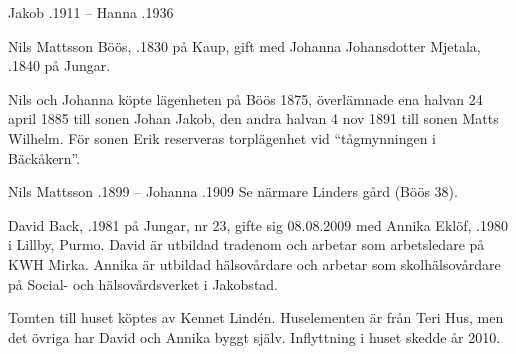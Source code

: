 Jakob .1911  --  Hanna .1936


Nils Mattsson Böös, .1830 på Kaup, gift med  Johanna Johansdotter Mjetala, .1840 på Jungar.
\begin{jhchildren}
  \item {}
  \item {}
  \item {}
  \item {}
  \item {}
  \item {}
  \item {}
  \item {}
  \item {}
  \item {}
  \item {}
  \item {}
\end{jhchildren}
Nils och Johanna köpte lägenheten på Böös 1875, överlämnade ena halvan 24 april 1885 till sonen Johan Jakob, den andra halvan 4 nov 1891 till sonen Matts Wilhelm. För sonen Erik reserveras torplägenhet vid ``tågmynningen i Bäckåkern''.

Nils Mattsson .1899  --  Johanna .1909
Se närmare Linders gård (Böös 38).




David Back, .1981 på Jungar, nr 23, gifte sig 08.08.2009 med Annika Eklöf, .1980 i Lillby, Purmo. David är utbildad
tradenom och arbetar som arbetsledare på KWH Mirka. Annika är	utbildad hälsovårdare och arbetar som skolhälsovårdare på Social-	och hälsovårdsverket i Jakobstad.


\begin{jhchildren}
  \item {}
  \item {}
\end{jhchildren}
Tomten till huset köptes av Kennet Lindén. Huselementen är från Teri Hus, men det övriga har David och Annika byggt själv. Inflyttning			i huset skedde år 2010.



